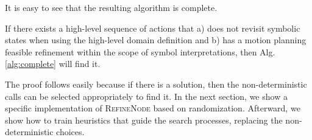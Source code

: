 It is easy to see that the resulting algorithm is complete.

\begin{thm}
If there exists a high-level sequence of actions that 
a) does not revisit symbolic states when using the high-level domain
definition and b) has a motion planning feasible refinement within the scope
of symbol interpretations, then Alg.\,\ref{alg:complete} will find it. 
\end{thm}

The proof follows easily because if there is a solution, then
the non-deterministic calls can be selected appropriately to find
it. In the next section, we show a specific implementation of \textsc{RefineNode}
based on randomization. Afterward, we show how to train
heuristics that guide the search processes, replacing the non-deterministic choices.



